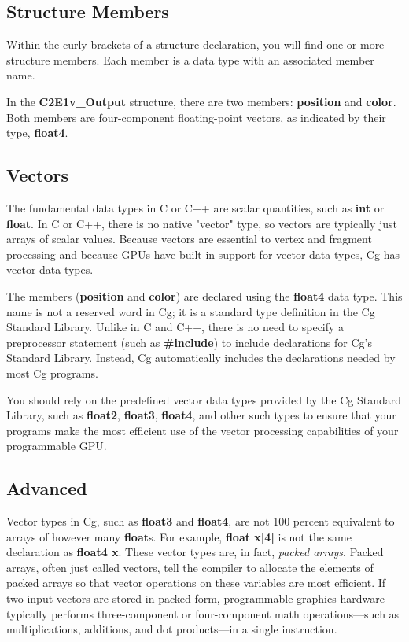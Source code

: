 \documentclass{book}
\begin{document}
\subsection{Structure Members}

Within the curly brackets of a structure declaration, you will find one or more structure members. Each member is a data type with an associated member name.

In the \textbf{C2E1v\_Output} structure, there are two members: \textbf{position} and \textbf{color}. Both members are four-component floating-point vectors, as indicated by their type, \textbf{float4}.

\subsection{Vectors}

The fundamental data types in C or C++ are scalar quantities, such as \textbf{int} or \textbf{float}. In C or C++, there is no native "vector" type, so vectors are typically just arrays of scalar values. Because vectors are essential to vertex and fragment processing and because GPUs have built-in support for vector data types, Cg has vector data types.

The members (\textbf{position} and \textbf{color}) are declared using the \textbf{float4} data type. This name is not a reserved word in Cg; it is a standard type definition in the Cg Standard Library. Unlike in C and C++, there is no need to specify a preprocessor statement (such as \textbf{\#include}) to include declarations for Cg's Standard Library. Instead, Cg automatically includes the declarations needed by most Cg programs.

You should rely on the predefined vector data types provided by the Cg Standard Library, such as \textbf{float2}, \textbf{float3}, \textbf{float4}, and other such types to ensure that your programs make the most efficient use of the vector processing capabilities of your programmable GPU.

\subsection*{Advanced}

Vector types in Cg, such as \textbf{float3} and \textbf{float4}, are not 100 percent equivalent to arrays of however many \textbf{float}s. For example, \textbf{float x[4]} is not the same declaration as \textbf{float4 x}. These vector types are, in fact, \textit{packed arrays}. Packed arrays, often just called vectors, tell the compiler to allocate the elements of packed arrays so that vector operations on these variables are most efficient. If two input vectors are stored in packed form, programmable graphics hardware typically performs three-component or four-component math operations—such as multiplications, additions, and dot products—in a single instruction.
\end{document}
